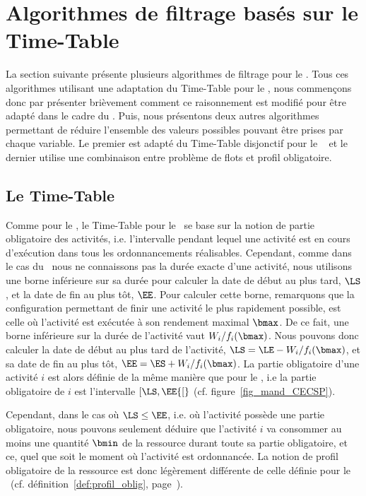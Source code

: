 
\section{Algorithmes de filtrage basés sur le Time-Table}
\label{sec:time_CECSP}
La section suivante présente plusieurs algorithmes de filtrage pour le
\CECSP. Tous ces algorithmes utilisant une adaptation du Time-Table
pour le \CUSP, nous commençons donc par présenter brièvement comment
ce raisonnement est modifié pour être adapté dans le cadre du \CECSP.
Puis, nous présentons deux autres algorithmes permettant
de réduire l'ensemble des valeurs possibles pouvant être prises par
chaque variable. Le premier est adapté du Time-Table disjonctif pour
le \CUSP~\cite{Gay2015} et le dernier utilise une combinaison entre
problème de flots et profil obligatoire.

\subsection{Le Time-Table}
\label{sec:TT_CECSP} 
Comme pour le \CUSP, le Time-Table pour le \CECSP~se base sur la
notion de partie obligatoire des activités, i.e. l'intervalle pendant
lequel une activité est en cours d'exécution dans tous les
ordonnancements réalisables. Cependant, comme dans le cas du
\CECSP~nous ne connaissons pas la durée exacte d'une activité, nous
utilisons une borne inférieure sur sa durée pour calculer la date de
début au plus tard, $\LS$, et la date de fin au plus tôt, $\EE$. Pour
calculer cette borne, remarquons que la configuration permettant de
finir une activité le plus rapidement possible, est celle où
l'activité est exécutée à son rendement maximal $\bmax$. De ce fait,
une borne inférieure sur la durée de l'activité vaut
$W_i/f_i(\bmax)$. Nous pouvons donc calculer la date de début au plus
tard de l'activité, $\LS=\LE -W_i/f_i(\bmax)$, et sa date de fin au
plus tôt, $\EE=\ES +W_i/f_i(\bmax)$. La partie obligatoire d'une
activité $i$ est alors définie de la même manière que pour le \CUSP,
i.e la partie obligatoire de $i$ est l'intervalle $[\LS,\EE{[}$
(cf. figure~\ref{fig_mand_CECSP}).

Cependant, dans le cas où $\LS \le \EE$, i.e. où l'activité possède
une partie obligatoire, nous pouvons seulement déduire que l'activité
$i$ va consommer au moins une quantité $\bmin$ de la ressource durant
toute sa partie obligatoire, et ce, quel que soit le moment où
l'activité est ordonnancée. La notion de profil obligatoire de la
ressource est donc légèrement différente de celle définie pour le
\CUSP~(cf. définition~\ref{def:profil_oblig},
page~\pageref{def:profil_oblig}).

